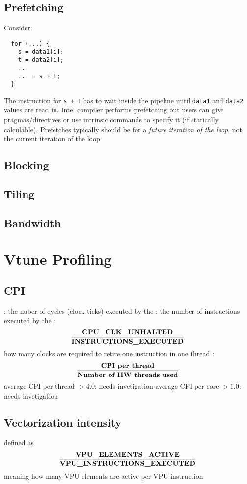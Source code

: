 \documentclass{myproc}
\begin{document}
\subsection{Prefetching}
\bit
\w Consider:
  \begin{verbatim}
  for (...) {
    s = data1[i];
    t = data2[i];
    ...
    ... = s + t; 
  }
  \end{verbatim}
\w The instruction for \verb|s + t| has to wait inside the pipeline until
\verb+data1+ and \verb+data2+ values are read in.
\w Intel compiler performs prefetching but users can give pragmas/directives
or use intrinsic commands to specify it (if statically calculable).
\w Prefetches typically should be for a {\em future iteration of the loop\/},
not the current iteration of the loop. 
\eit

\subsection{Blocking}

\subsection{Tiling}

\subsection{Bandwidth}

\section{Vtune Profiling}


\subsection{CPI}
\bit
\w {}: the nuber of cycles (clock ticks) executed by the
\w {}: the number of instructions executed by the
\w {}: 
 \[
 \frac{\mbox{{\bf{}CPU\_CLK\_UNHALTED}}}{\mbox{\bf{}INSTRUCTIONS\_EXECUTED}} \]
  \bit
  \w how many clocks are required to retire one instruction in one thread
  \eit
\w {}: 
 \[ \frac{\mbox{{\bf{}CPI per thread}}}{\mbox{\bf{}Number of HW threads
     used}} \]  
  \bit
  \w 
  \eit
\w average CPI per thread $> 4.0$: needs invetigation
\w average CPI per core $> 1.0$: needs invetigation
\eit

\subsection{Vectorization intensity}
\bit
\w defined as 
 \[ \frac{\mbox{{\bf{}VPU\_ELEMENTS\_ACTIVE}}}{\mbox{\bf{}VPU\_INSTRUCTIONS\_EXECUTED}} \]
meaning how many VPU elements are active per VPU instruction
\eit
\end{document}

